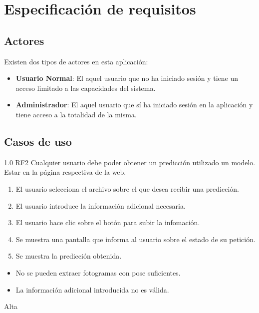 \section{Especificación de requisitos}

\subsection{Actores}

Existen dos tipos de actores en esta aplicación:

\begin{itemize}
    \item \textbf{Usuario Normal}: El aquel usuario que no ha iniciado sesión y
          tiene un acceso limitado a las capacidades del sistema.
    \item \textbf{Administrador}: El aquel usuario que sí ha iniciado sesión en
          la aplicación y tiene acceso a la totalidad de la misma.
\end{itemize}

\subsection{Casos de uso}


{1.0}
{RF2}
{Cualquier usuario debe poder obtener un predicción utilizado un modelo.}
{Estar en la página respectiva de la web.}
{
    \begin{enumerate}
        \def\labelenumi{\arabic{enumi}.}
        \tightlist
        \item El usuario selecciona el archivo sobre el que desea recibir una predicción.
        \item El usuario introduce la información adicional necesaria.
        \item El usuario hace clic sobre el botón para subir la infomación.
        \item Se muestra una pantalla que informa al usuario sobre el estado de
              su petición.
        \item Se muestra la predicción obtenida.
    \end{enumerate}
}
{}
{
    \begin{itemize}
        \item No se pueden extraer fotogramas con pose suficientes.
        \item La información adicional introducida no es válida.
    \end{itemize}
}
{Alta}

